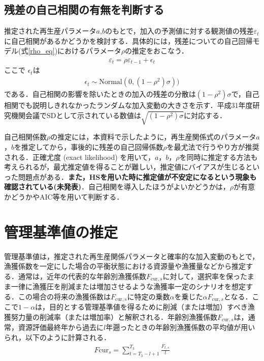 \documentclass[11pt]{jsarticle}
\begin{document}
\subsection{残差の自己相関の有無を判断する\label{estrho}}
推定された再生産パラメータ$a$,$b$のもとで，加入の予測値に対する観測値の残差$\varepsilon_t$に自己相関があるかどうかを検討する．具体的には，残差についての自己回帰モデル(式\ref{rho_eq})におけるパラメータ$\rho$の推定をおこなう．
\begin{eqnarray}
  \varepsilon_t = \rho \varepsilon_{t-1} + \epsilon_t
  \label{rho_eq}
\end{eqnarray}
ここで $\epsilon_t$は
\begin{eqnarray}
  \epsilon_t \sim \mathrm{Normal}(0, (1-\rho^2) \sigma))
\end{eqnarray}
である．自己相関の影響を除いたときの加入の残差の分散は$(1-\rho^2) \sigma$で，自己相関でも説明しきれなかったランダムな加入変動の大きさを示す．平成31年度研究機関会議でSDとして示されている数値は$\sqrt{(1-\rho^2) \sigma}$に対応する．

自己相関係数$\rho$の推定には，本資料で示したように，再生産関係式のパラメータ$a$，$b$を推定してから，事後的に残差の自己回帰係数$\rho$を最尤法で行うやり方が推奨される．正確尤度 (exact likelihood) を用いて，$a$，$b$，$\rho$を同時に推定する方法も考えられるが，最尤推定値を得ることが難しい，推定値にバイアスが生じるといった問題点がある\cite{johnson}．{\bf また，HSを用いた時に推定値が不安定になるという現象も確認されている(未発表)}．自己相関を導入したほうがよいかどうかは，$\rho$が有意かどうかやAIC等を用いて判断する．

\section{管理基準値の推定}
管理基準値は，推定された再生産関係パラメータと確率的な加入変動のもとで，漁獲係数を一定にした場合の平衡状態における資源量や漁獲量などから推定する．通常は，近年の代表的な年齢別漁獲係数$F_{\mathrm{cur},s}$に対して，選択率を保ったまま一律に漁獲圧を削減または増加させるような漁獲率一定のシナリオを想定する．この場合の将来の漁獲係数は$F_{\mathrm{cur},s}$に特定の乗数$\alpha$を乗じた$\alpha F_{\mathrm{cur},s}$となる．ここで$1-\alpha$は，目的とする管理基準値を得るために削減（または増加）すべき漁獲努力量の削減率（または増加率）と解釈される．年齢別漁獲係数$F_{\mathrm{cur},s}$は，通常，資源評価最終年から過去に$l$年遡ったときの年齢別漁獲係数の平均値が用いられ，以下のように計算される．
\begin{eqnarray}
  F\mathrm{cur}_s = \sum_{t=T_3-l+1}^{T_3}\frac{F_{t,s}}{l}
\end{eqnarray}
\end{document}
